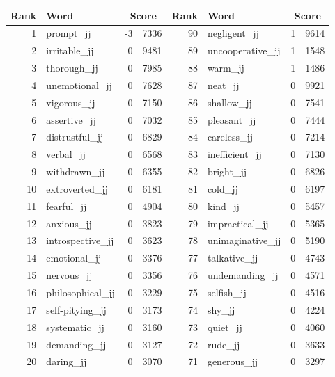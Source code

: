 \begin{table}[tbp]
    \begin{tabular}{| rlr@{.}l | rlr@{.}l |}
    \hline
    \textbf{Rank} & \textbf{Word} & \multicolumn{2}{c|}{\textbf{Score}} & \textbf{Rank} & \textbf{Word} & \multicolumn{2}{c|}{\textbf{Score}} \\
    \hline
    1 & prompt\_jj & -3 & 7336    &    90 & negligent\_jj & 1 & 9614 \\
    2 & irritable\_jj & 0 & 9481    &    89 & uncooperative\_jj & 1 & 1548 \\
    3 & thorough\_jj & 0 & 7985    &    88 & warm\_jj & 1 & 1486 \\
    4 & unemotional\_jj & 0 & 7628    &    87 & neat\_jj & 0 & 9921 \\
    5 & vigorous\_jj & 0 & 7150    &    86 & shallow\_jj & 0 & 7541 \\
    6 & assertive\_jj & 0 & 7032    &    85 & pleasant\_jj & 0 & 7444 \\
    7 & distrustful\_jj & 0 & 6829    &    84 & careless\_jj & 0 & 7214 \\
    8 & verbal\_jj & 0 & 6568    &    83 & inefficient\_jj & 0 & 7130 \\
    9 & withdrawn\_jj & 0 & 6355    &    82 & bright\_jj & 0 & 6826 \\
    10 & extroverted\_jj & 0 & 6181    &    81 & cold\_jj & 0 & 6197 \\
    11 & fearful\_jj & 0 & 4904    &    80 & kind\_jj & 0 & 5457 \\
    12 & anxious\_jj & 0 & 3823    &    79 & impractical\_jj & 0 & 5365 \\
    13 & introspective\_jj & 0 & 3623    &    78 & unimaginative\_jj & 0 & 5190 \\
    14 & emotional\_jj & 0 & 3376    &    77 & talkative\_jj & 0 & 4743 \\
    15 & nervous\_jj & 0 & 3356    &    76 & undemanding\_jj & 0 & 4571 \\
    16 & philosophical\_jj & 0 & 3229    &    75 & selfish\_jj & 0 & 4516 \\
    17 & self-pitying\_jj & 0 & 3173    &    74 & shy\_jj & 0 & 4224 \\
    18 & systematic\_jj & 0 & 3160    &    73 & quiet\_jj & 0 & 4060 \\
    19 & demanding\_jj & 0 & 3127    &    72 & rude\_jj & 0 & 3633 \\
    20 & daring\_jj & 0 & 3070    &    71 & generous\_jj & 0 & 3297 \\

\end{tabular}
\end{table}
